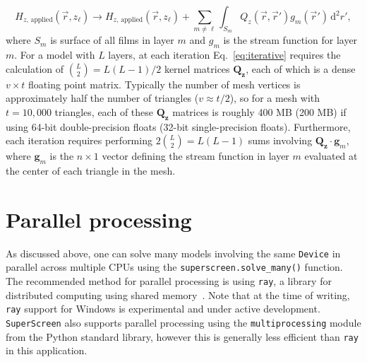 \documentclass[final,3p,times]{elsarticle}
\newcommand{\inline}[1]{\texttt{#1}\xspace}
\newcommand{\SuperScreen}{\inline{SuperScreen}}
\begin{document}
\begin{equation}
    H_{z,\,\mathrm{applied}}(\vec{r}, z_\ell) \to
    H_{z,\,\mathrm{applied}}(\vec{r}, z_\ell)
    + \sum_{m\neq\ell}
    \int_{S_m} Q_z(\vec{r},\vec{r}')g_m(\vec{r}')\,\mathrm{d}^2r',
    \label{eq:iterative}
\end{equation}
where $S_m$ is surface of all films in layer $m$ and $g_m$ is the stream function for layer $m$. For a model with $L$ layers, at each iteration Eq.~\ref{eq:iterative} requires the calculation of $\binom{L}{2} = L(L-1)/2$ kernel matrices $\mathbf{Q_z}$, each of which is a dense $v\times t$ floating point matrix. Typically the number of mesh vertices is approximately half the number of triangles ($v\approx t / 2$), so for a mesh with $t=10,000$ triangles, each of these $\mathbf{Q_z}$ matrices is roughly 400 MB (200 MB) if using 64-bit double-precision floats (32-bit single-precision floats). Furthermore, each iteration requires performing $2\binom{L}{2} = L(L-1)$ sums involving $\mathbf{Q_z}\cdot\mathbf{g}_m$, where $\mathbf{g}_m$ is the $n\times1$ vector defining the stream function in layer $m$ evaluated at the center of each triangle in the mesh.


\section{Parallel processing}
\label{section:parallel}
As discussed above, one can solve many models involving the same \inline{Device} in parallel across multiple CPUs using the \inline{superscreen.solve_many()} function. The recommended method for parallel processing is using \inline{ray}, a library for distributed computing using shared memory~\cite{Moritz2018-mt}. Note that at the time of writing, \inline{ray} support for Windows is experimental and under active development. \SuperScreen also supports parallel processing using the \inline{multiprocessing} module from the Python standard library, however this is generally less efficient than \inline{ray} in this application.
\end{document}
